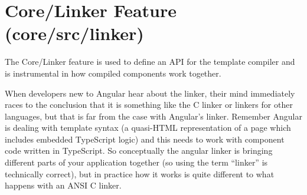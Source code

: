 \section{Core/Linker Feature (core/src/linker)}

The Core/Linker feature is used to define an API for the template compiler and is
instrumental in how compiled components work together.

When developers new to Angular hear about the linker, their mind immediately races
to the conclusion that it is something like the C linker or linkers for other languages,
but that is far from the case with Angular’s linker. Remember Angular is dealing with
template syntax (a quasi-HTML representation of a page which includes embedded
TypeScript logic) and this needs to work with component code written in TypeScript.
So conceptually the angular linker is bringing different parts of your application
together (so using the term “linker” is technically correct), but in practice how it works
is quite different to what happens with an ANSI C linker.




